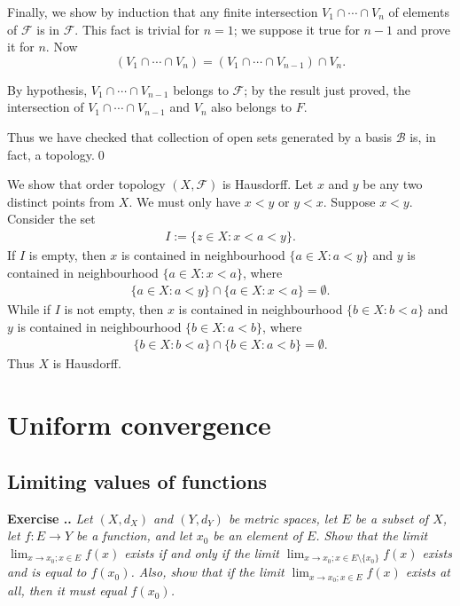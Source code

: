 \documentclass{book}
\newcounter{Exercise}[section]
\renewcommand{\theExercise}{\thesection.\arabic{Exercise}.}
\newcommand{\new}{\vspace{1.5em}\noindent\textbf{Exercise \stepcounter{Exercise}\textbf{\theExercise}} }
\begin{document}
{    Finally, we show by induction that any finite intersection $V_1\cap\cdots\cap V_n$ of elements of $\mathcal{F}$ is in $\mathcal{F}$. This fact is trivial for $n=1$; we suppose it true for $n-1$ and prove it for $n$. Now $$(V_1\cap\cdots\cap V_n)=(V_1\cap\cdots\cap V_{n-1})\cap V_n.$$

    By hypothesis, $V_1\cap\cdots\cap V_{n-1}$ belongs to $\mathcal{F}$; by the result just proved, the intersection of $V_1\cap\cdots\cap V_{n-1}$ and $V_n$ also belongs to $F$.

    Thus we have checked that collection of open sets generated by a basis $\mathcal{B}$ is, in fact, a topology.\qed
}

We show that order topology $(X,\mathcal{F})$ is Hausdorff. Let $x$ and $y$ be any two distinct points from $X$. We must only have $x<y$ or $y<x$. Suppose $x<y$. Consider the set
    \begin{align*}
        I:=\{z\in X:x<a<y\}.
    \end{align*}
If $I$ is empty, then $x$ is contained in neighbourhood $\{a\in X:a<y\}$ and $y$ is contained in neighbourhood $\{a\in X:x<a\}$, where
    \begin{align*}
        \{a\in X:a<y\}\cap\{a\in X:x<a\}=\emptyset.
    \end{align*}
While if $I$ is not empty, then $x$ is contained in neighbourhood $\{b\in X:b<a\}$ and $y$ is contained in neighbourhood $\{b\in X:a<b\}$, where
    \begin{align*}
        \{b\in X:b<a\}\cap\{b\in X:a<b\}=\emptyset.
    \end{align*}
Thus $X$ is Hausdorff.




\chapter{Uniform convergence}
\section{Limiting values of functions}
\new\emph{Let $(X,d_X)$ and $(Y,d_Y)$ be metric spaces, let $E$ be a subset of $X$, let $f:E\to Y$ be a function, and let $x_0$ be an element of $E$. Show that the limit $\lim_{x\to x_0;x\in E}f(x)$ exists if and only if the limit $\lim_{x\to x_0;x\in E\setminus\{x_0\}}f(x)$ exists and is equal to $f(x_0)$. Also, show that if the limit $\lim_{x\to x_0;x\in E}f(x)$ exists at all, then it must equal $f(x_0)$.}
\end{document}
